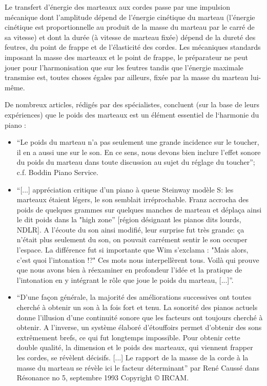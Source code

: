 \documentclass[french,a4paper,12pt]{report}
\begin{document}
Le transfert d’énergie des marteaux aux cordes passe par une impulsion mécanique dont l’amplitude dépend de l’énergie cinétique du marteau (l’énergie cinétique est proportionnelle au produit de la masse du marteau par le carré de sa vitesse) et dont la durée (à vitesse de marteau fixée) dépend de la dureté des feutres, du point de frappe et de l’élasticité des cordes. Les mécaniques standards imposant la masse des marteaux et le point de frappe, le préparateur ne peut jouer pour l’harmonisation que sur les feutres tandis que l’énergie maximale transmise est, toutes choses égales par ailleurs, fixée par la masse du marteau lui-même.

De nombreux articles, rédigés par des spécialistes, concluent (sur la base de leurs expériences) que le poids des marteaux est un élément essentiel de l‘harmonie du piano :

\begin{itemize}
	\item  “Le poids du marteau n'a pas seulement une grande incidence sur le toucher, il en a aussi une sur le son. En ce sens, nous devons bien inclure l'effet sonore du poids du marteau dans toute discussion au sujet du réglage du toucher”; c.f. Boddin Piano Service.

	\item  “[...] appréciation critique d'un piano à queue Steinway modèle S: les marteaux étaient légers, le son semblait irréprochable. Franz accrocha des poids de quelques grammes sur quelques manches de marteau et déplaça ainsi le dit poids dans la "high zone” [région désignant les pianos dits lourds, NDLR]. A l'écoute du son ainsi modifié, leur surprise fut très grande: ça n'était plus seulement du son, on pouvait carrément sentir le son occuper l'espace. La différence fut si importante que Wim s'exclama : "Mais alors, c'est quoi l'intonation !?" Ces mots nous interpellèrent tous. Voilà qui prouve que nous avons bien à réexaminer en profondeur l'idée et la pratique de l'intonation en y intégrant le rôle que joue le poids du marteau, [...]”.

	\item  “D'une façon générale, la majorité des améliorations successives ont toutes cherché à obtenir un son à la fois fort et tenu. La sonorité des pianos actuels donne l'illusion d'une continuité sonore que les facteurs ont toujours cherché à obtenir. A l'inverse, un système élaboré d'étouffoirs permet d'obtenir des sons extrêmement brefs, ce qui fut longtemps impossible. Pour obtenir cette double qualité, la dimension et le poids des marteaux, qui viennent frapper les cordes, se révèlent décisifs. [...] Le rapport de la masse de la corde à la masse du marteau se révèle ici le facteur déterminant” par René Caussé dans Résonance no 5, septembre 1993 Copyright © IRCAM.

\end{itemize}
\end{document}
